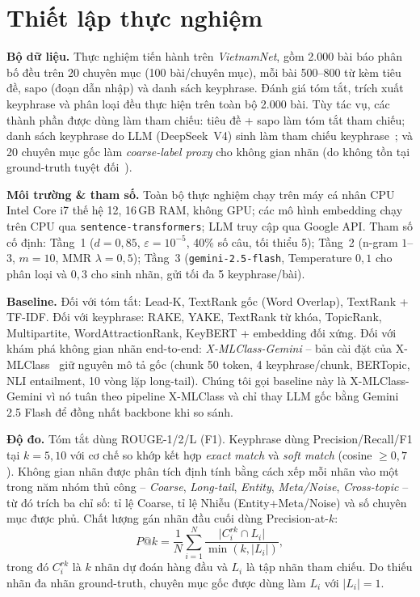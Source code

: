 \section{Thiết lập thực nghiệm}
\textbf{Bộ dữ liệu.} Thực nghiệm tiến hành trên \emph{VietnamNet}, gồm 2.000 bài
báo phân bố đều trên 20 chuyên mục (100 bài/chuyên mục), mỗi bài 500--800 từ kèm
tiêu đề, sapo (đoạn dẫn nhập) và danh sách keyphrase. Đánh giá tóm tắt, trích xuất keyphrase và phân loại đều thực hiện trên toàn bộ
2.000 bài. Tùy tác vụ, các thành phần được
dùng làm tham chiếu: tiêu đề + sapo làm tóm tắt tham chiếu; danh sách keyphrase do
LLM (DeepSeek~V4) sinh làm tham chiếu keyphrase~\cite{pavlovic2024effectiveness};
và 20 chuyên mục gốc làm
\emph{coarse-label proxy} cho không gian nhãn (do không tồn tại ground-truth
tuyệt đối~\cite{wan2024tnt}).

\textbf{Môi trường \& tham số.} Toàn bộ thực nghiệm chạy trên máy cá nhân CPU
Intel Core i7 thế hệ 12, 16\,GB RAM, không GPU; các mô hình embedding chạy trên
CPU qua \texttt{sentence-transformers}; LLM truy cập qua Google API. Tham số cố
định: Tầng~1 ($d=0{,}85$, $\varepsilon=10^{-5}$, 40\% số câu, tối thiểu 5); Tầng~2
(n-gram $1$--$3$, $m=10$, MMR $\lambda=0{,}5$); Tầng~3 (\texttt{gemini-2.5-flash},
Temperature $0{,}1$ cho phân loại và $0{,}3$ cho sinh nhãn, gửi tối đa 5
keyphrase/bài).

\textbf{Baseline.} Đối với tóm tắt: Lead-K, TextRank gốc (Word Overlap), TextRank
+ TF-IDF. Đối với keyphrase: RAKE, YAKE, TextRank từ khóa, TopicRank, Multipartite,
WordAttractionRank, KeyBERT + embedding đối xứng. Đối với khám phá không gian nhãn
end-to-end: \emph{X-MLClass-Gemini} -- bản cài đặt của X-MLClass~\cite{li2024open} giữ nguyên
mô tả gốc (chunk 50 token, 4 keyphrase/chunk, BERTopic, NLI entailment, 10 vòng
lặp long-tail). Chúng tôi gọi baseline này là X-MLClass-Gemini vì nó tuân theo
pipeline X-MLClass và chỉ thay LLM gốc bằng Gemini 2.5 Flash để đồng nhất backbone
khi so sánh.

\textbf{Độ đo.} Tóm tắt dùng ROUGE-1/2/L (F1). Keyphrase dùng Precision/Recall/F1
tại $k=5,10$ với cơ chế so khớp kết hợp \emph{exact match} và \emph{soft match}
(cosine $\geq 0{,}7$). Không gian nhãn được phân tích định tính bằng cách xếp mỗi
nhãn vào một trong năm nhóm thủ công -- \emph{Coarse}, \emph{Long-tail}, \emph{Entity},
\emph{Meta/Noise}, \emph{Cross-topic} -- từ đó trích ba chỉ số: tỉ lệ Coarse, tỉ
lệ Nhiễu (Entity+Meta/Noise) và số chuyên mục được phủ. Chất lượng gán nhãn đầu
cuối dùng Precision-at-$k$:
\begin{equation}
P@k = \frac{1}{N}\sum_{i=1}^{N}
\frac{\lvert C_i^{rk}\cap L_i\rvert}{\min(k,\lvert L_i\rvert)},
\label{eq:pak}
\end{equation}
trong đó $C_i^{rk}$ là $k$ nhãn dự đoán hàng đầu và $L_i$ là tập nhãn tham chiếu.
Do thiếu nhãn đa nhãn ground-truth, chuyên mục gốc được dùng làm $L_i$ với
$\lvert L_i\rvert=1$.

